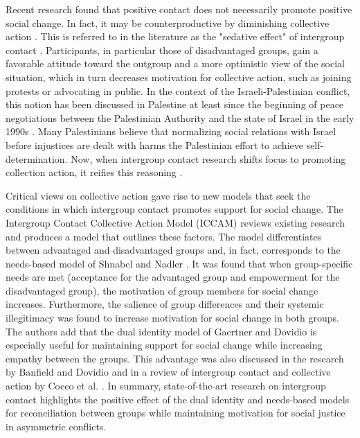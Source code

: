 \documentclass[dissertation,math,vertlayout,pdfa,colorlinks]{aaltoseries}
\begin{document}
Recent research found that positive contact does not necessarily promote positive social change. In fact, it may be counterproductive by diminishing collective action \cite{saguyIronyHarmonyIntergroup2009,dixonLetThemEat2010,dixonPrejudiceAreNegative2012}. This is referred to in the literature as the "sedative effect" of intergroup contact \cite{cakalInvestigationSocialIdentity2011}. Participants, in particular those of disadvantaged groups, gain a favorable attitude toward the outgroup and a more optimistic view of the social situation, which in turn decreases motivation for collective action, such as joining protests or advocating in public. In the context of the Israeli-Palestinian conflict, this notion has been discussed in Palestine at least since the beginning of peace negotiations between the Palestinian Authority and the state of Israel in the early 1990s \cite{miariAttitudesPalestiniansNormalization1999}. Many Palestinians believe that normalizing social relations with Israel before injustices are dealt with harms the Palestinian effort to achieve self-determination. Now, when intergroup contact research shifts focus to promoting collection action, it reifies this reasoning \cite{albzourSupportNormalizationRelations2019}.

Critical views on collective action gave rise to new models that seek the conditions in which intergroup contact promotes support for social change. The Intergroup Contact Collective Action Model (ICCAM)\cite{hasslerIntergroupContactSocial2021} reviews existing research and produces a model that outlines these factors. The model differentiates between advantaged and disadvantaged groups and, in fact, corresponds to the needs-based model of Shnabel and Nadler \cite{hasslerNeedSatisfactionIntergroup2022,shnabelChapterFourNeedsbased2023}. It was found that when group-specific needs are met (acceptance for the advantaged group and empowerment for the disadvantaged group), the motivation of group members for social change increases. Furthermore, the salience of group differences and their systemic illegitimacy was found to increase motivation for social change in both groups. The authors add that the dual identity model of Gaertner and Dovidio is especially useful for maintaining support for social change while increasing empathy between the groups. This advantage was also discussed in the research by Banfield and Dovidio \cite{banfieldWhitesPerceptionsDiscrimination2013} and in a review of intergroup contact and collective action by Cocco et al. \cite{coccoMobilizingSedativeEffects2024}. In summary, state-of-the-art research on intergroup contact highlights the positive effect of the dual identity and needs-based models for reconciliation between groups while maintaining motivation for social justice in asymmetric conflicts.
\end{document}
